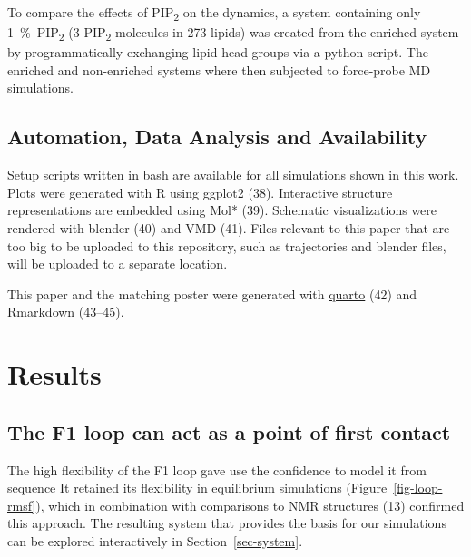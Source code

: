 \documentclass[
  letterpaper,
  DIV=11,
  numbers=noendperiod]{scrartcl}
\begin{document}
To compare the effects of PIP\textsubscript{2} on the dynamics, a system
containing only 1~\%~PIP\textsubscript{2} (3 PIP\textsubscript{2}
molecules in 273 lipids) was created from the enriched system by
programmatically exchanging lipid head groups via a python script. The
enriched and non-enriched systems where then subjected to force-probe MD
simulations.

\hypertarget{automation-data-analysis-and-availability}{%
\subsection{Automation, Data Analysis and
Availability}\label{automation-data-analysis-and-availability}}

Setup scripts written in bash are available for all simulations shown in
this work. Plots were generated with R using ggplot2 (38). Interactive
structure representations are embedded using Mol* (39). Schematic
visualizations were rendered with blender (40) and VMD (41). Files
relevant to this paper that are too big to be uploaded to this
repository, such as trajectories and blender files, will be uploaded to
a separate location.

This paper and the matching poster were generated with
\href{https://quarto.org/}{quarto} (42) and Rmarkdown (43--45).

\hypertarget{results}{%
\section{Results}\label{results}}

\hypertarget{the-f1-loop-can-act-as-a-point-of-first-contact}{%
\subsection{The F1 loop can act as a point of first
contact}\label{the-f1-loop-can-act-as-a-point-of-first-contact}}

The high flexibility of the F1 loop gave use the confidence to model it
from sequence It retained its flexibility in equilibrium simulations
(Figure~\ref{fig-loop-rmsf}), which in combination with comparisons to
NMR structures (13) confirmed this approach. The resulting system that
provides the basis for our simulations can be explored interactively in
Section~\ref{sec-system}.
\end{document}
